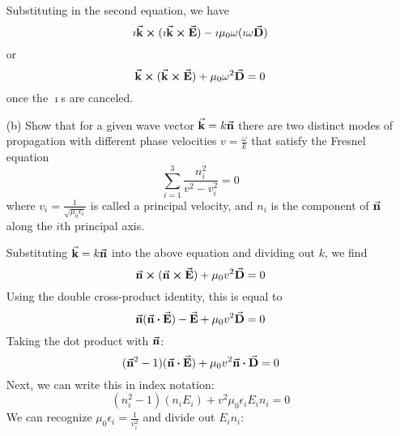 \documentclass[a4paper,twoside]{article}
\begin{document}
\begin{itemize}
\begin{problem}
\begin{equation}
            \end{equation}
            Substituting in the second equation, we have
            \begin{equation}
                \imath \va{k} \cross (\imath \va{k} \cross \va{E}) - \imath \mu_0 \omega ( \imath \omega \va{D})
            \end{equation}
            or
            \begin{equation}
                \va{k} \cross ( \va{k} \cross \va{E}) + \mu_0 \omega^2 \va{D} = 0
            \end{equation}
            once the $ \imath $s are canceled.
        \end{problem}
    \item[(b)] Show that for a given wave vector $ \va{k} = k \va{n} $ there are two distinct modes of propagation with different phase velocities $ v = \frac{\omega}{k} $ that satisfy the Fresnel equation
        \begin{equation}
            \sum_{i=1}^{3} \frac{n_i^2}{v^2 - v_i^2} = 0
        \end{equation}
        where $ v_i = \frac{1}{\sqrt{\mu_0 \epsilon_i}} $ is called a principal velocity, and $ n_i $ is the component of $ \va{n} $ along the $ i $th principal axis.
        \begin{problem}
            Substituting $ \va{k} = k \va{n} $ into the above equation and dividing out $ k $, we find
            \begin{equation}
                \va{n} \cross ( \va{n} \cross \va{E}) + \mu_0 v^2 \va{D} = 0
            \end{equation}
            Using the double cross-product identity, this is equal to
            \begin{equation}
                \va{n} ( \va{n} \vdot \va{E}) - \va{E} + \mu_0 v^2 \va{D} = 0
            \end{equation}
            Taking the dot product with $ \va{n} $:
            \begin{equation}
                (\va{n}^2 - 1)( \va{n} \vdot \va{E}) + \mu_0 v^2 \va{n} \vdot \va{D} = 0
            \end{equation}
            Next, we can write this in index notation:
            \begin{equation}
                (n_i^2 - 1)(n_i E_i) + v^2 \mu_0 \epsilon_i E_i n_i = 0
            \end{equation}
            We can recognize $ \mu_0 \epsilon_i = \frac{1}{v_i^2} $ and divide out $ E_i n_i $:

\end{problem}
\end{itemize}
\end{document}
